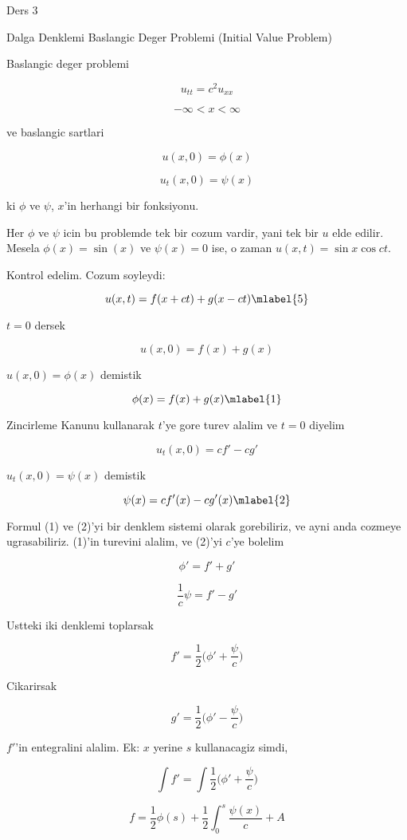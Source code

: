 \documentclass[12pt,fleqn]{article}\usepackage{../common}
\begin{document}
Ders 3

Dalga Denklemi Baslangic Deger Problemi (Initial Value Problem) 

Baslangic deger problemi 

\[ u_{tt} = c^2u_{xx} \]

\[ -\infty < x < \infty \]

ve baslangic sartlari 

\[ u(x,0) = \phi(x) \]

\[ u_t(x,0) = \psi(x) \]

ki $\phi$ ve $\psi$, $x$'in herhangi bir fonksiyonu. 

Her $\phi$ ve $\psi$ icin bu problemde tek bir cozum vardir, yani tek bir
$u$ elde edilir. Mesela $\phi(x) = \sin(x)$ ve $\psi(x) = 0$ ise, o zaman
$u(x,t) = \sin x \cos ct$. 

Kontrol edelim. Cozum soyleydi:

\[ u(x,t) = f(x+ct) + g(x-ct)  
\mlabel{5}
\]

$t=0$ dersek 

\[ u(x,0)  = f(x) + g(x) \]

$u(x,0) = \phi(x)$ demistik

\[ \phi(x) = f(x) + g(x) 
\mlabel{1} 
\]

Zincirleme Kanunu kullanarak $t$'ye gore turev alalim ve $t=0$ diyelim

\[ u_t(x,0) = cf' - cg' \]

$u_t(x,0) = \psi(x)$ demistik

\[ \psi(x) = cf'(x) - cg'(x) 
\mlabel{2} \]

Formul (1) ve (2)'yi bir denklem sistemi olarak gorebiliriz, ve ayni anda
cozmeye ugrasabiliriz. (1)'in turevini alalim, ve (2)'yi $c$'ye bolelim

\[ \phi' = f' + g' \]

\[ \frac{1}{c}\psi = f' - g' \]

Ustteki iki denklemi toplarsak

\[ f' = \frac{1}{2} \bigg( \phi' + \frac{\psi}{c}  \bigg) \]

Cikarirsak

\[ g' = \frac{1}{2}  \bigg( \phi' - \frac{\psi}{c}  \bigg) \]


$f'$'in entegralini alalim. Ek: $x$ yerine $s$ kullanacagiz simdi,

\[ \int f' = \int \frac{1}{2} \bigg( \phi' + \frac{\psi}{c}  \bigg) \]

\[ f = \frac{1}{2}\phi(s) + \frac{1}{2}\int_0^s \frac{\psi(x)}{c} + A\]
\end{document}
